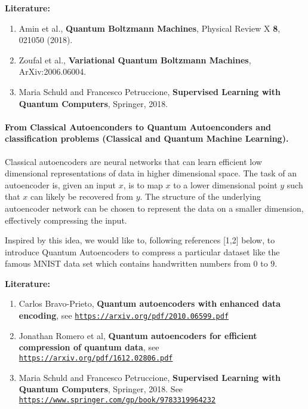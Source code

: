 \documentclass[%
oneside,                 %
final,                   %
10pt]{article}
\begin{document}
\textbf{Literature:}

\begin{enumerate}
\item Amin et al., \textbf{Quantum Boltzmann Machines}, Physical Review X \textbf{8}, 021050 (2018).

\item Zoufal et al., \textbf{Variational Quantum Boltzmann Machines}, ArXiv:2006.06004.

\item Maria Schuld and Francesco Petruccione, \textbf{Supervised Learning with Quantum Computers}, Springer, 2018.
\end{enumerate}

\noindent
\paragraph{From Classical Autoenconders to Quantum Autoenconders and classification problems (Classical and Quantum Machine Learning).}
Classical autoencoders are neural networks that can learn efficient
low dimensional representations of data in higher dimensional
space. The task of an autoencoder is, given an input $x$, is to map
$x$ to a lower dimensional point $y$ such that $x$ can likely be
recovered from $y$. The structure of the underlying autoencoder
network can be chosen to represent the data on a smaller dimension,
effectively compressing the input.

Inspired by this idea, we would like to, following references [1,2]
below, to introduce Quantum Autoencoders to compress a particular
dataset like the famous MNIST data set which contains handwritten
numbers from $0$ to $9$.

\textbf{Literature:}

\begin{enumerate}
\item Carlos Bravo-Prieto, \textbf{Quantum autoencoders with enhanced data encoding}, see \href{{https://arxiv.org/pdf/2010.06599.pdf}}{\nolinkurl{https://arxiv.org/pdf/2010.06599.pdf}} 

\item Jonathan Romero et al, \textbf{Quantum autoencoders for efficient compression of quantum data}, see \href{{https://arxiv.org/pdf/1612.02806.pdf}}{\nolinkurl{https://arxiv.org/pdf/1612.02806.pdf}}

\item Maria Schuld and Francesco Petruccione, \textbf{Supervised Learning with Quantum Computers}, Springer, 2018. See \href{{https://www.springer.com/gp/book/9783319964232}}{\nolinkurl{https://www.springer.com/gp/book/9783319964232}}
\end{enumerate}
\end{document}
